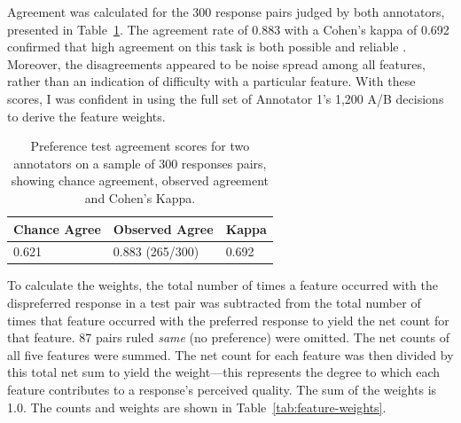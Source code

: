 Agreement was calculated for the 300 response pairs judged by both annotators, presented in Table~\ref{tab:preference-agreement}. The agreement rate of 0.883 with a Cohen's kappa of 0.692 confirmed that high agreement on this task is both possible and reliable \citep{landis1977measurement, artstein:massimo:2008}. Moreover, the disagreements appeared to be noise spread among all features, rather than an indication of difficulty with a particular feature. With these scores, I was confident in using the full set of Annotator 1's 1,200 A/B decisions to derive the feature weights.

\begin{table}[htb!]
\begin{center}
\begin{tabular}{|l|l|l|}
\hline
 Chance Agree & Observed Agree & Kappa \\
\hline
0.621 & 0.883 (265/300) & 0.692 \\
\hline
\end{tabular}
\caption{\label{tab:preference-agreement} Preference test agreement scores for two annotators on a sample of 300 responses pairs, showing chance agreement, observed agreement and Cohen's Kappa.}
\end{center}
\end{table}

To calculate the weights, the total number of times a feature occurred with the dispreferred response in a test pair was subtracted from the total number of times that feature occurred with the preferred response to yield the net count for that feature. 87 pairs ruled \textit{same} (no preference) were omitted. The net counts of all five features were summed. The net count for each feature was then divided by this total net sum to yield the weight---this represents the degree to which each feature contributes to a response's perceived quality. The sum of the weights is 1.0. The counts and weights are shown in Table~\ref{tab:feature-weights}.

